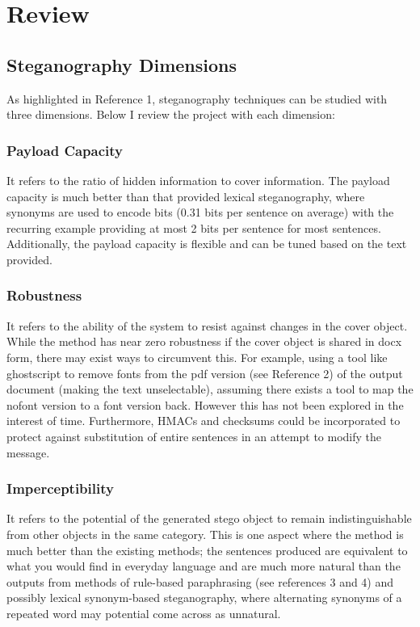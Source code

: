 \documentclass{article}
\begin{document}
\section{Review}
\subsection{Steganography Dimensions}
As highlighted in Reference 1,
steganography techniques can be studied with three dimensions. Below I review the project with each dimension:
\subsubsection{Payload Capacity}
It refers to the ratio of hidden information to cover information.
The payload capacity is much better than that provided lexical steganography, where synonyms are used to encode bits (0.31 bits per sentence on average) with the recurring example providing
at most 2 bits per sentence for most sentences.
Additionally, the payload capacity is flexible and can be tuned based on the text provided.
\subsubsection{Robustness}
It refers to the ability of the system to resist against changes in the cover object. While the method has near zero robustness if the cover object is shared in docx form, there may exist ways to circumvent this. For example, using a tool like ghostscript to remove fonts from the pdf version (see Reference 2) of the output document (making the text unselectable), assuming there exists a tool to map the nofont version to a font version back. However this has not been explored in the interest of time. Furthermore, HMACs and checksums could be incorporated to protect against substitution of entire sentences in an attempt to modify the message.
\subsubsection{Imperceptibility}
It refers to the potential of the generated stego object to remain indistinguishable from other objects in the same category. This is one aspect where the method is much better than the existing methods; the sentences produced are equivalent to what you would find in everyday language and are much more natural than the outputs from methods of rule-based paraphrasing (see references 3 and 4) and possibly lexical synonym-based steganography, where alternating synonyms of a repeated word may potential come across as unnatural.
\end{document}
